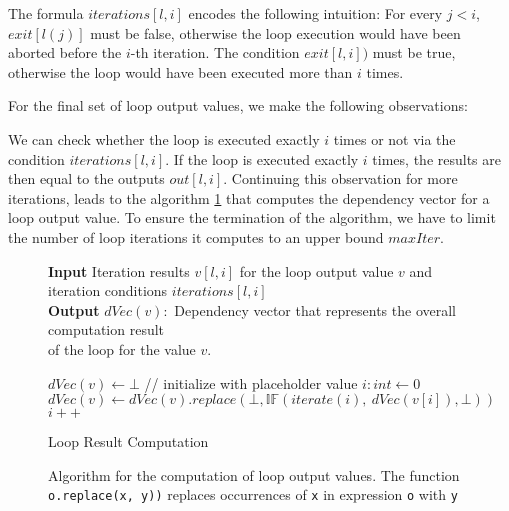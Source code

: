 The formula $iterations[l, i]$ encodes the following intuition: For every $j < i$, \\$exit[l(j)]$ must be false, otherwise the loop execution would have been aborted before the $i$-th iteration. The condition $exit[l, i])$ must be true, otherwise the loop would have been executed more than $i$ times.

For the final set of loop output values, we make the following observations:

We can check whether the loop is executed exactly $i$ times or not via the condition $iterations[l, i]$. If the loop is executed exactly $i$ times, the results are then equal to the outputs $out[l, i]$.  Continuing this observation for more iterations, leads to the algorithm \ref{alg:loop} that computes the dependency vector for a loop output value. To ensure the termination of the algorithm, we have to limit the number of loop iterations it computes to an upper bound $maxIter$.

\begin{figure}
    \centering
    \begin{algorithm}[H]
    \hspace*{\algorithmicindent} \textbf{Input} Iteration results $v[l, i]$ for the loop output value $v$ and \\
    \hspace*{\algorithmicindent} iteration conditions $iterations[l, i]$ \\
    \hspace*{\algorithmicindent} \textbf{Output} $dVec(v):$ Dependency vector that represents the overall computation result\\
    \hspace*{\algorithmicindent} \hspace*{\algorithmicindent}of the loop for the value $v$. \\
    
    \begin{algorithmic}[1]
        \State $dVec(v) \leftarrow \bot$ // initialize with placeholder value
        \State $i: int \leftarrow 0$
            \State $dVec(v) \leftarrow dVec(v).replace(\bot, \mathbb{IF}(iterate(i), \: dVec(v[i]), \bot))$
            \State $i++$
        \EndWhile
        \end{algorithmic}
\caption{Loop Result Computation}\label{alg:loop}
\end{algorithm}
    \caption{Algorithm for the computation of loop output values. The function \texttt{o.replace(x, y))} replaces occurrences of \texttt{x} in expression \texttt{o} with \texttt{y}}
\end{figure}


